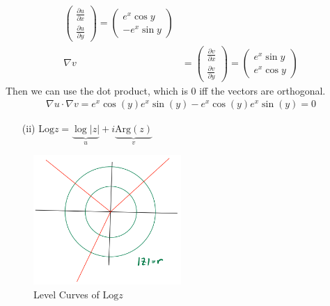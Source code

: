 \begin{example}
\begin{align*}
\begin{pmatrix}
                         \frac{\partial u}{\partial x} \\ \frac{\partial u}{\partial y}
                     \end{pmatrix} = \begin{pmatrix}
                                         e^x\cos y \\ -e^x\sin y
                                     \end{pmatrix} \\
        \nabla v & = \begin{pmatrix}
                         \frac{\partial v}{\partial x} \\ \frac{\partial v}{\partial y}
                     \end{pmatrix} = \begin{pmatrix}
                                         e^x\sin y \\ e^x\cos y
                                     \end{pmatrix}
    \end{align*}
    Then we can use the dot product, which is $0$ iff the vectors are orthogonal.
    \begin{align*}
        \nabla u \cdot \nabla v = e^{x}\cos(y)e^{x}\sin(y) - e^{x}\cos(y)e^{x}\sin(y) = 0
    \end{align*}
\end{example}

\begin{example}
    \begin{itemize}
        \item[(ii)] $\text{Log} z = \underbrace{\log |z|}_u + i\underbrace{\text{Arg}(z)}_v$
    \end{itemize}
    \begin{figure}[H]
        \centering
        \includegraphics[width=0.5\textwidth]{LECTURE_17/graph2.png}
        \caption{Level Curves of $\text{Log} z$}
    \end{figure}
\end{example}

